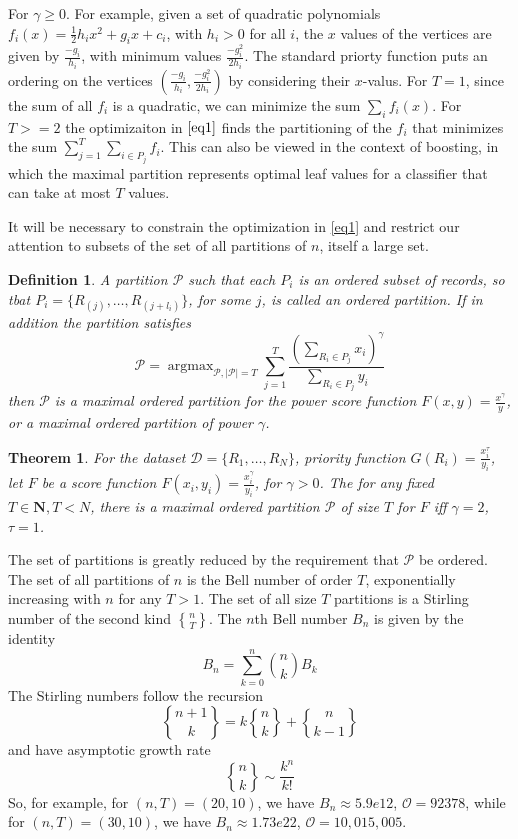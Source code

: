 \documentclass{article}
\newtheorem{thm}{Theorem}
\newtheorem{definition}{Definition}
\theoremstyle{case}
\DeclareMathOperator*{\argmax}{argmax} %
\newcommand{\stirlingii}{\genfrac{\{}{\}}{0pt}{}}
\begin{document}
For $\gamma \geq 0$. For example, given a set of quadratic polynomials $f_i(x) = \frac{1}{2}h_ix^2 + g_ix + c_i$, with $h_i >0$ for all $i$, the $x$ values of the vertices are given by $\frac{-g_i}{h_i}$, with minimum values $\frac{-g_i^2}{2h_i}$. The standard priorty function puts an ordering on the vertices $\left(\frac{-g_i}{h_i},\frac{-g_i^2}{2h_i}\right)$ by considering their $x$-valus. For $T = 1$, since the sum of all $f_i$ is a quadratic, we can minimize the sum $\sum_i f_i(x)$. For $T >= 2$ the optimizaiton in $\ref{eq1}$ finds the partitioning of the $f_i$ that minimizes the sum $\sum_{j=1}^T \sum_{i \in P_j} f_i$. This can also be viewed in the context of boosting, in which the maximal partition represents optimal leaf values for a classifier that can take at most $T$ values.

It will be necessary to constrain the optimization in \ref{eq1} and restrict our attention to subsets of the set of all partitions of $n$, itself a large set.

\begin{definition}
A partition $\mathcal{P}$ such that each $P_i$ is an ordered subset of records, so tbat $P_i = \{R_{(j)}, \dots, R_{(j+l_i)}\}$, for some $j$, is called an ordered partition. If in addition the partition satisfies
\[
\mathcal{P} = \argmax_{\mathcal{P}, \vert \mathcal{P} \vert = T}\sum_{j=1}^{T}\frac{(\sum_{R_i \in P_j}x_i)^\gamma}{\sum_{R_i \in P_j}y_i}
\]
then $\mathcal{P}$ is a maximal ordered partition for the power score function $F(x,y) = \frac{x^\gamma}{y}$, or a maximal ordered partition of power $\gamma$.
\end{definition}

\begin{thm}
For the dataset $\mathcal{D} = \{R_1, \dots, R_N\}$, priority function $G(R_i) = \frac{x_i^\tau}{y_i}$, let $F$ be a score function $F(x_i, y_i) = \frac{x_i^\gamma}{y_i}$, for $\gamma > 0$. The for any fixed $T \in \mathbf{N}, T < N$, there is a maximal ordered partition $\mathcal{P}$ of size $T$ for $F$ iff $\gamma = 2$, $\tau = 1$.
\end{thm}

The set of partitions is greatly reduced by the requirement that $\mathcal{P}$ be ordered. The set of all partitions of $n$ is the Bell number of order $T$, exponentially increasing with $n$ for any $T > 1$. The set of all size $T$ partitions is a Stirling number of the second kind $\stirlingii{n}{T}$. The $n$th Bell number $B_n$ is given by the identity
\[B_n = \sum_{k=0}^{n} \binom{n}{k} B_k\]
The Stirling numbers follow the recursion
\[\stirlingii{n+1}{k} = k\stirlingii{n}{k} + \stirlingii{n}{k-1}\]
and have asymptotic growth rate 
\[\stirlingii{n}{k} \sim \frac{k^n}{k!}\]
So, for example, for $\left(n,T\right) = \left(20, 10\right)$, we have $B_n \approx 5.9e12$, $\mathcal{O} = 92378$, while for $\left(n,T\right) = \left(30, 10\right)$, we have $B_n \approx 1.73e22$, $\mathcal{O} = 10,015,005$.
\end{document}
